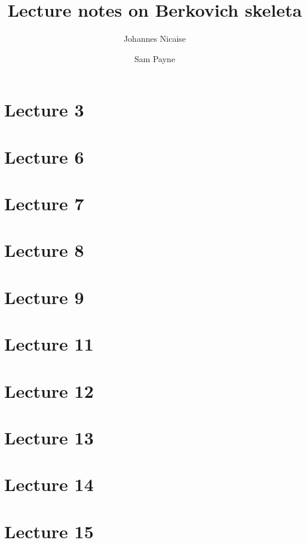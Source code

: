 \documentclass[10pt,a4paper]{article}
\title{Lecture notes on Berkovich skeleta}
\author{Johannes Nicaise \and Sam Payne}
\numberwithin{equation}{section}
\begin{document}
\maketitle




\section{Lecture 3}




\section{Lecture 6}
\section{Lecture 7}
\section{Lecture 8}
\section{Lecture 9}



\section{Lecture 11}
\section{Lecture 12}
\section{Lecture 13}
\section{Lecture 14}
\section{Lecture 15}
\end{document}
